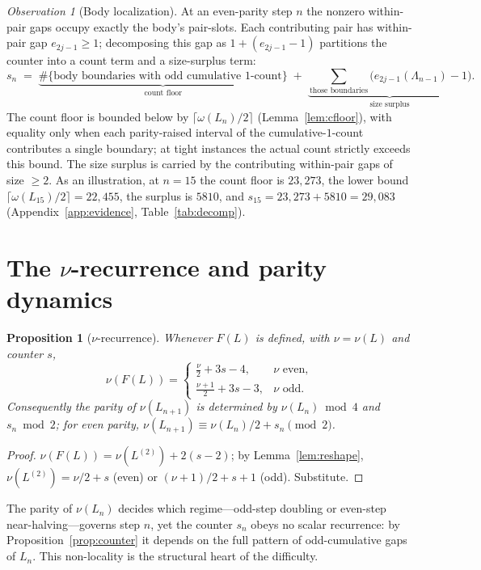 \documentclass[11pt,reqno]{amsart}
\theoremstyle{plain}
\newtheorem{proposition}{Proposition}
\theoremstyle{definition}
\theoremstyle{remark}
\newtheorem{observation}{Observation}
\begin{document}
\begin{observation}[Body localization]\label{obs:decomp}
At an even-parity step $n$ the nonzero within-pair gaps occupy exactly the body's pair-slots. Each contributing pair has within-pair gap $e_{2j-1}\ge 1$; decomposing this gap as $1+(e_{2j-1}-1)$ partitions the counter into a count term and a size-surplus term:
\begin{equation}\label{eq:decomp}
s_n \;=\; \underbrace{\#\{\text{body boundaries with odd cumulative $1$-count}\}}_{\text{count floor}}
\;+\;\underbrace{\sum_{\text{those boundaries}}\bigl(e_{2j-1}(\Lambda_{n-1})-1\bigr)}_{\text{size surplus}}.
\end{equation}
The count floor is bounded below by $\lceil\omega(L_n)/2\rceil$ (Lemma~\ref{lem:cfloor}), with equality only when each parity-raised interval of the cumulative-$1$-count contributes a single boundary; at tight instances the actual count strictly exceeds this bound. The size surplus is carried by the contributing within-pair gaps of size $\ge 2$. As an illustration, at $n=15$ the count floor is $23{,}273$, the lower bound $\lceil\omega(L_{15})/2\rceil=22{,}455$, the surplus is $5810$, and $s_{15}=23{,}273+5810=29{,}083$ (Appendix~\ref{app:evidence}, Table~\ref{tab:decomp}).
\end{observation}

\section{The $\nu$-recurrence and parity dynamics}\label{sec:nu}
\begin{proposition}[$\nu$-recurrence]\label{prop:nu}
Whenever $F(L)$ is defined, with $\nu=\nu(L)$ and counter $s$,
\[ \nu(F(L))=\begin{cases}\tfrac{\nu}{2}+3s-4, & \nu\text{ even},\\ \tfrac{\nu+1}{2}+3s-3, & \nu\text{ odd}.\end{cases} \]
Consequently the parity of $\nu(L_{n+1})$ is determined by $\nu(L_n)\bmod 4$ and $s_n\bmod 2$; for even parity, $\nu(L_{n+1})\equiv\nu(L_n)/2+s_n\pmod 2$.
\end{proposition}
\begin{proof}
$\nu(F(L))=\nu(L^{(2)})+2(s-2)$; by Lemma~\ref{lem:reshape}, $\nu(L^{(2)})=\nu/2+s$ (even) or $(\nu+1)/2+s+1$ (odd). Substitute.
\end{proof}

The parity of $\nu(L_n)$ decides which regime---odd-step doubling or even-step near-halving---governs step $n$, yet the counter $s_n$ obeys no scalar recurrence: by Proposition~\ref{prop:counter} it depends on the full pattern of odd-cumulative gaps of $L_n$. This non-locality is the structural heart of the difficulty.
\end{document}
